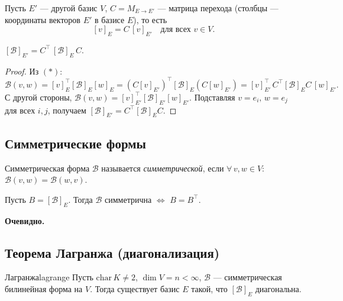 Пусть $E'$ — другой базис $V$, $C = M_{E \to E'}$ — матрица перехода (столбцы — координаты векторов $E'$ в базисе $E$), то есть
\[
[v]_E = C\,[v]_{E'} \quad \text{для всех } v \in V. \tag{$*$}
\]

\begin{Statement}{}{}
	$[\mathcal{B}]_{E'} = C^{\top}\,[\mathcal{B}]_E\,C$.
\end{Statement}

\begin{proof}
	Из $(*)$:
	\[
	\mathcal{B}(v,w) = [v]_E^{\top}[\mathcal{B}]_E[w]_E
	= (C[v]_{E'})^{\top}[\mathcal{B}]_E(C[w]_{E'})
	= [v]_{E'}^{\top}\, C^{\top}[\mathcal{B}]_E C\,[w]_{E'}.
	\]
	С другой стороны, $\mathcal{B}(v,w) = [v]_{E'}^{\top}[\mathcal{B}]_{E'}[w]_{E'}$.
	Подставляя $v = e_i,\, w = e_j$ для всех $i,j$, получаем $[\mathcal{B}]_{E'} = C^{\top}[\mathcal{B}]_E C$.
\end{proof}

\subsection{Симметрические формы}

\begin{Definition}{Симметрическая форма}{}
	$\mathcal{B}$ называется \textit{симметрической}, если $\forall\, v, w \in V$: $\mathcal{B}(v, w) = \mathcal{B}(w, v)$.
\end{Definition}

\begin{Statement}{}{}
	Пусть $B = [\mathcal{B}]_E$. Тогда $\mathcal{B}$ симметрична $\Longleftrightarrow$ $B = B^{\top}$.
\end{Statement}

\textbf{Очевидно.}

\subsection{Теорема Лагранжа (диагонализация)}

\begin{Theorem}{Лагранжа}{lagrange}
	Пусть $\mathrm{char}\,K \neq 2$, $\dim V = n < \infty$, $\mathcal{B}$ — симметрическая билинейная форма на $V$.
	Тогда существует базис $E$ такой, что $[\mathcal{B}]_E$ диагональна.
\end{Theorem}

